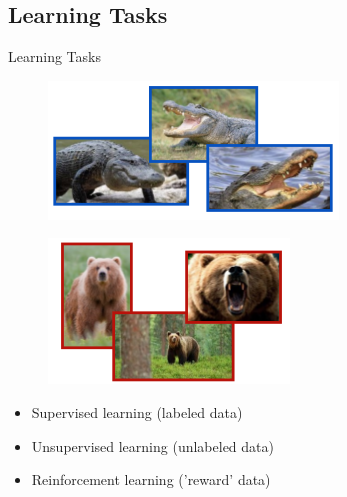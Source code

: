 \documentclass[mathserif]{beamer}
\begin{document}
\subsection{Learning Tasks}
\begin{frame}{Learning Tasks}
\begin{multicols}{2}
\begin{figure}[H]
\centering
\includegraphics[scale=0.5]{figures/supervised_1.png}
\end{figure}

\begin{figure}[H]
\centering
\includegraphics[scale=0.5]{figures/supervised_2.png}
\end{figure}

\columnbreak
\begin{itemize}
\item Supervised learning (labeled data)
\item Unsupervised learning (unlabeled data)
\item Reinforcement learning ('reward' data)
\end{itemize}
\end{multicols}
\end{frame}
\end{document}
